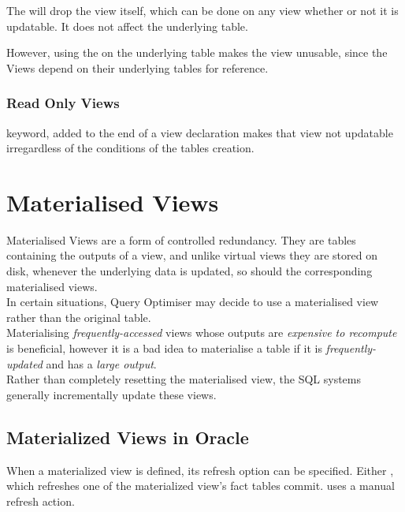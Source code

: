 \documentclass[11pt,a4paper,twocolumn]{book}
\begin{document}
\subsubsection{}

The  will drop the view itself, which can be done on any view whether or not it is updatable. It does not affect the underlying table.

However, using the  on the underlying table makes the view unusable, since the Views depend on their underlying tables for reference.

\subsubsection{Read Only Views}

 keyword, added to the end of a view declaration makes that view not updatable irregardless of the conditions of the tables creation.

\section{Materialised Views}

Materialised Views are a form of controlled redundancy. They are tables containing the outputs of a view, and unlike virtual views they are stored on disk, whenever the underlying data is updated, so should the corresponding materialised views.\\

In certain situations, Query Optimiser may decide to use a materialised view rather than the original table.\\

Materialising \textit{frequently-accessed} views whose outputs are  \textit{expensive to recompute} is beneficial, however it is a bad idea to materialise a table if it is \textit{frequently-updated} and has a \textit{large output}. \\

Rather than completely resetting the materialised view, the SQL systems generally incrementally update these views.\\

\subsection{Materialized Views in Oracle}

When a materialized view is defined, its refresh option can be specified. Either , which refreshes one of the materialized view's fact tables commit.  uses a manual refresh action.\\
\end{document}
